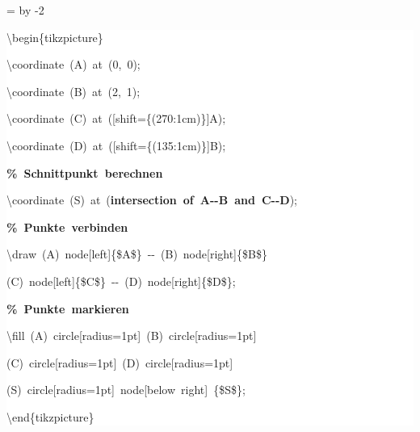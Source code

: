 \begingroup
\ttfamily
{}
=\textwidth
\advance{} by -2\fboxsep
\noindent
\colorbox{background}
{%
\parbox{\dimen255}
{%
\rule[-0.5ex]{0pt}{2.5ex}\hspace*{0.0em}\textbackslash{}begin\{tikzpicture\}\\
\rule[-0.5ex]{0pt}{2.5ex}\hspace*{1.0em}\textbackslash{}coordinate~(A)~at~(0,~0);\\
\rule[-0.5ex]{0pt}{2.5ex}\hspace*{1.0em}\textbackslash{}coordinate~(B)~at~(2,~1);\\
\rule[-0.5ex]{0pt}{2.5ex}\hspace*{1.0em}\textbackslash{}coordinate~(C)~at~([shift=\{(270:1cm)\}]A);\\
\rule[-0.5ex]{0pt}{2.5ex}\hspace*{1.0em}\textbackslash{}coordinate~(D)~at~([shift=\{(135:1cm)\}]B);\\
\rule[-0.5ex]{0pt}{2.5ex}\hspace*{1.0em}\textcolor{G}{\textbf{\%~Schnittpunkt~berechnen}}\\
\rule[-0.5ex]{0pt}{2.5ex}\hspace*{1.0em}\textbackslash{}coordinate~(S)~at~(\textcolor{R}{\textbf{intersection~of~A{-}{-}B~and~C{-}{-}D}});\\
\rule[-0.5ex]{0pt}{2.5ex}\hspace*{1.0em}\textcolor{G}{\textbf{\%~Punkte~verbinden}}\\
\rule[-0.5ex]{0pt}{2.5ex}\hspace*{1.0em}\textbackslash{}draw~(A)~node[left]\{\$A\$\}~{-}{-}~(B)~node[right]\{\$B\$\}\\
\rule[-0.5ex]{0pt}{2.5ex}\hspace*{4.0em}(C)~node[left]\{\$C\$\}~{-}{-}~(D)~node[right]\{\$D\$\};\\
\rule[-0.5ex]{0pt}{2.5ex}\hspace*{1.0em}\textcolor{G}{\textbf{\%~Punkte~markieren}}\\
\rule[-0.5ex]{0pt}{2.5ex}\hspace*{1.0em}\textbackslash{}fill~(A)~circle[radius=1pt]~(B)~circle[radius=1pt]\\
\rule[-0.5ex]{0pt}{2.5ex}\hspace*{4.0em}(C)~circle[radius=1pt]~(D)~circle[radius=1pt]\\
\rule[-0.5ex]{0pt}{2.5ex}\hspace*{4.0em}(S)~circle[radius=1pt]~node[below~right]~\{\$S\$\};\\
\rule[-0.5ex]{0pt}{2.5ex}\hspace*{0.0em}\textbackslash{}end\{tikzpicture\}}%
}%
\endgroup

